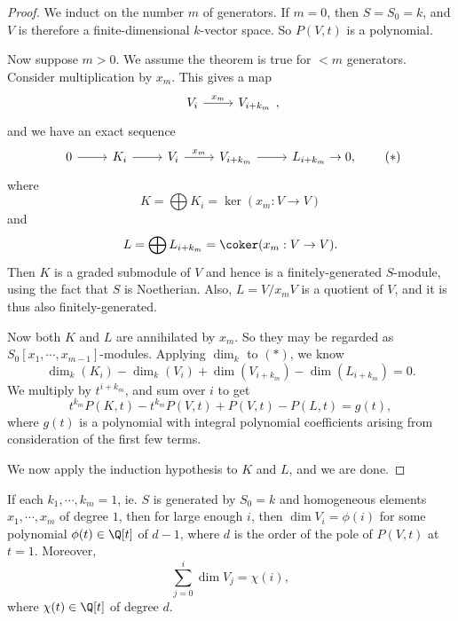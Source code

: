 \documentclass[a4paper]{article}
\begin{document}
\begin{proof}
  We induct on the number $m$ of generators. If $m = 0$, then $S = S_0 = k$, and $V$ is therefore a finite-dimensional $k$-vector space. So $P(V, t)$ is a polynomial.

  Now suppose $m > 0$. We assume the theorem is true for $<m$ generators. Consider multiplication by $x_m$. This gives a map
  \[
    \begin{tikzcd}
      V_i \ar[r, "x_m"] & V_{i + k_m}
    \end{tikzcd},
  \]
  and we have an exact sequence
  \[
    \begin{tikzcd}
      0 \ar[r] & K_i \ar[r] & V_i \ar[r, "x_m"] & V_{i + k_m}\ar [r] & L_{i + k_m} \to 0,
    \end{tikzcd}\tag{$*$}
  \]
  where
  \[
    K = \bigoplus K_i = \ker (x_m: V \to V)
  \]
  and
  \[
    L = \bigoplus L_{i + k_m} = \coker (x_m: V \to V).
  \]
  Then $K$ is a graded submodule of $V$ and hence is a finitely-generated $S$-module, using the fact that $S$ is Noetherian. Also, $L = V/x_m V$ is a quotient of $V$, and it is thus also finitely-generated.

  Now both $K$ and $L$ are annihilated by $x_m$. So they may be regarded as $S_0[x_1, \cdots, x_{m - 1}]$-modules. Applying $\dim_k$ to $(*)$, we know
  \[
    \dim_k (K_i) - \dim_k (V_i) + \dim (V_{i + k_m}) - \dim (L_{i + k_m}) = 0.
  \]
  We multiply by $t^{i + k_m}$, and sum over $i$ to get
  \[
    t^{k_m} P(K, t) - t^{k_m} P(V, t) + P(V, t) - P(L, t) = g(t),
  \]
  where $g(t)$ is a polynomial with integral polynomial coefficients arising from consideration of the first few terms.

  We now apply the induction hypothesis to $K$ and $L$, and we are done.
\end{proof}

\begin{cor}
  If each $k_1, \cdots, k_m = 1$, ie. $S$ is generated by $S_0 = k$ and homogeneous elements $x_1, \cdots, x_m$ of degree $1$, then for large enough $i$, then $\dim V_i = \phi(i)$ for some polynomial $\phi(t) \in \Q[t]$ of $d - 1$, where $d$ is the order of the pole of $P(V, t)$ at $t = 1$. Moreover,
  \[
    \sum_{j = 0}^i \dim V_j = \chi(i),
  \]
  where $\chi(t) \in \Q[t]$ of degree $d$.
\end{cor}
\end{document}
